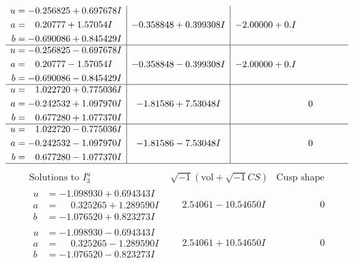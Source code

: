 \documentclass[1p]{elsarticle_modified}
\theoremstyle{definition}
\newcommand{\I}{\sqrt{-1}}
\begin{document}
$$\begin{array}{c|c|c}
\begin{aligned}
u &= -0.256825 + 0.697678 I \\
a &= \phantom{-}0.20777 + 1.57054 I \\
b &= -0.690086 + 0.845429 I\end{aligned}
 & -0.358848 + 0.399308 I & -2.00000 + 0. I\phantom{ +0.000000I} \\ \hline\begin{aligned}
u &= -0.256825 - 0.697678 I \\
a &= \phantom{-}0.20777 - 1.57054 I \\
b &= -0.690086 - 0.845429 I\end{aligned}
 & -0.358848 - 0.399308 I & -2.00000 + 0. I\phantom{ +0.000000I} \\ \hline\begin{aligned}
u &= \phantom{-}1.022720 + 0.775036 I \\
a &= -0.242532 + 1.097970 I \\
b &= \phantom{-}0.677280 + 1.077370 I\end{aligned}
 & -1.81586 + 7.53048 I & \phantom{-0.000000 } 0 \\ \hline\begin{aligned}
u &= \phantom{-}1.022720 - 0.775036 I \\
a &= -0.242532 - 1.097970 I \\
b &= \phantom{-}0.677280 - 1.077370 I\end{aligned}
 & -1.81586 - 7.53048 I & \phantom{-0.000000 } 0\\
 \hline 
 \end{array}$$\newpage$$\begin{array}{c|c|c}  
\text{Solutions to }I^u_{3}& \I (\text{vol} + \sqrt{-1}CS) & \text{Cusp shape}\\
 \hline 
\begin{aligned}
u &= -1.098930 + 0.694343 I \\
a &= \phantom{-}0.325265 + 1.289590 I \\
b &= -1.076520 + 0.823273 I\end{aligned}
 & \phantom{-}2.54061 - 10.54650 I & \phantom{-0.000000 } 0 \\ \hline\begin{aligned}
u &= -1.098930 - 0.694343 I \\
a &= \phantom{-}0.325265 - 1.289590 I \\
b &= -1.076520 - 0.823273 I\end{aligned}
 & \phantom{-}2.54061 + 10.54650 I & \phantom{-0.000000 } 0 \\ \hline\begin{aligned}

\end{aligned}
\end{array}$$
\end{document}
